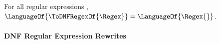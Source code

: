 \documentclass[acmsmall,screen]{acmart}
\begin{document}
\begin{theorem}
  \label{thm:dnfrs}
  For all regular expressions \Regex{},
  $\LanguageOf{\ToDNFRegexOf{\Regex}}=\LanguageOf{\Regex{}}$.
\end{theorem}




\paragraph*{DNF Regular Expression Rewrites}
\end{document}
